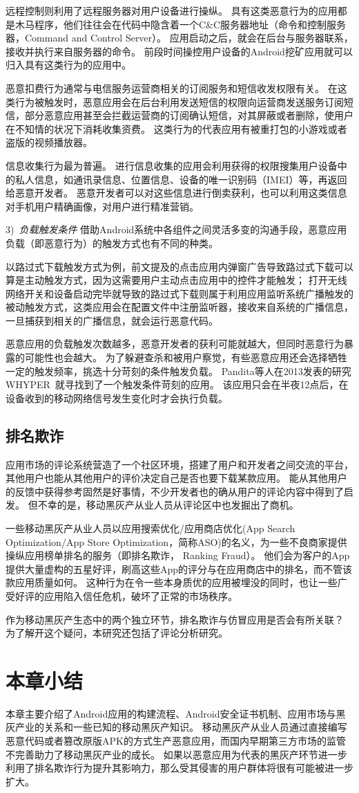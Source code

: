 远程控制则利用了远程服务器对用户设备进行操纵。
具有这类恶意行为的应用都是木马程序，他们往往会在代码中隐含着一个C\&C服务器地址（命令和控制服务器，Command and Control Server）。
应用启动之后，就会在后台与服务器联系，接收并执行来自服务器的命令。
前段时间操控用户设备的Android挖矿应用就可以归入具有这类行为的应用中。

恶意扣费行为通常与电信服务运营商相关的订阅服务和短信收发权限有关。
在这类行为被触发时，恶意应用会在后台利用发送短信的权限向运营商发送服务订阅短信，部分恶意应用甚至会拦截运营商的订阅确认短信，对其屏蔽或者删除，使用户在不知情的状况下消耗收集资费。
这类行为的代表应用有被重打包的小游戏或者盗版的视频播放器。

信息收集行为最为普遍。
进行信息收集的应用会利用获得的权限搜集用户设备中的私人信息，如通讯录信息、位置信息、设备的唯一识别码（IMEI）等，再返回给恶意开发者。
恶意开发者可以对这些信息进行倒卖获利，也可以利用这类信息对手机用户精确画像，对用户进行精准营销。

3)\ \emph{负载触发条件} \quad
借助Android系统中各组件之间灵活多变的沟通手段，恶意应用负载（即恶意行为）的触发方式也有不同的种类。

以路过式下载触发方式为例，前文提及的点击应用内弹窗广告导致路过式下载可以算是主动触发方式，因为这需要用户主动点击应用中的控件才能触发；
打开无线网络开关和设备启动完毕就导致的路过式下载则属于利用应用监听系统广播触发的被动触发方式，这类应用会在配置文件中注册监听器，接收来自系统的广播信息，一旦捕获到相关的广播信息，就会运行恶意代码。

恶意应用的负载触发次数越多，恶意开发者的获利可能就越大，但同时恶意行为暴露的可能性也会越大。
为了躲避查杀和被用户察觉，有些恶意应用还会选择牺牲一定的触发频率，挑选十分苛刻的条件触发负载。
Pandita等人在2013发表的研究WHYPER~\cite{pandita2013whyper}就寻找到了一个触发条件苛刻的应用。
该应用只会在半夜12点后，在设备收到的移动网络信号发生变化时才会执行负载。

\subsection{排名欺诈}
应用市场的评论系统营造了一个社区环境，搭建了用户和开发者之间交流的平台，其他用户也能从其他用户的评价决定自己是否也要下载某款应用。
能从其他用户的反馈中获得参考固然是好事情，不少开发者也的确从用户的评论内容中得到了启发。
但不幸的是，移动黑灰产从业人员从评论区中也发掘出了商机。

一些移动黑灰产从业人员以应用搜索优化/应用商店优化(App Search Optimization/App Store Optimization，简称ASO)的名义，为一些不良商家提供操纵应用榜单排名的服务（即排名欺诈， Ranking Fraud）。
他们会为客户的App提供大量虚构的五星好评，刷高这些App的评分与在应用商店中的排名，而不管该款应用质量如何。
这种行为在令一些本身质优的应用被埋没的同时，也让一些广受好评的应用陷入信任危机，破坏了正常的市场秩序。

作为移动黑灰产生态中的两个独立环节，排名欺诈与仿冒应用是否会有所关联？
为了解开这个疑问，本研究还包括了评论分析研究。

\section{本章小结}
本章主要介绍了Android应用的构建流程、Android安全证书机制、应用市场与黑灰产业的关系和一些已知的移动黑灰产知识。
移动黑灰产从业人员通过直接编写恶意代码或者篡改原版APK的方式生产恶意应用，而国内早期第三方市场的监管不完善助力了移动黑灰产业的成长。
如果以恶意应用为代表的黑灰产环节进一步利用了排名欺诈行为提升其影响力，那么受其侵害的用户群体将很有可能被进一步扩大。

